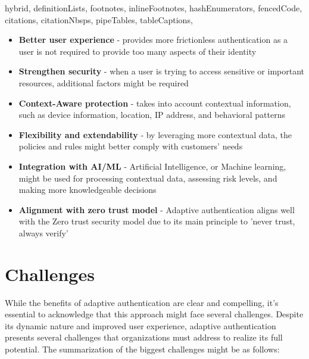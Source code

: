 \documentclass[
  digital,     %
  oneside,     %
  nosansbold,  %
  nocolorbold, %
  lof,         %
  lot,         %
]{fithesis4}
\begin{document}
\begin{markdown*}{%
  hybrid,
  definitionLists,
  footnotes,
  inlineFootnotes,
  hashEnumerators,
  fencedCode,
  citations,
  citationNbsps,
  pipeTables,
  tableCaptions,
}

\begin{itemize}
    \item \textbf{Better user experience} - provides more frictionless authentication as a user is not required to provide too many aspects of their identity
    \item \textbf{Strengthen security} - when a user is trying to access sensitive or important resources, additional factors might be required
    \item \textbf{Context-Aware protection} - takes into account contextual information, such as device information, location, IP address, and behavioral patterns
    \item \textbf{Flexibility and extendability} - by leveraging more contextual data, the policies and rules might better comply with customers' needs
    \item \textbf{Integration with AI/ML} - Artificial Intelligence, or Machine learning, might be used for processing contextual data, assessing risk levels, and making more knowledgeable decisions
    \item \textbf{Alignment with zero trust model} - Adaptive authentication aligns well with the Zero trust security model due to its main principle to 'never trust, always verify'
\end{itemize}

\newpage
\section{Challenges}
While the benefits of adaptive authentication are clear and compelling, it's essential to acknowledge that this approach might face several challenges.
Despite its dynamic nature and improved user experience, adaptive authentication presents several challenges that organizations must address to realize its full potential.
\newline
\newline
The summarization of the biggest challenges might be as follows:



\end{markdown*}
\end{document}
